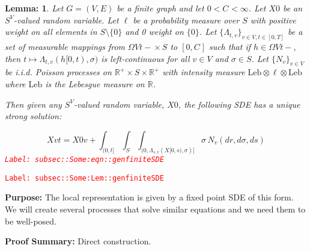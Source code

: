 \documentclass[12pt]{article}
\newcommand{\mb}{\mathbb}
\newcommand{\te}{\text}
\newcommand{\tr}{\textcolor{red}}
\newcommand{\labe}[1]{\tr{\texttt{Label: #1}}}
\newcommand{\purpose}{\textbf{Purpose: }}
\newcommand{\pfsum}{\textbf{Proof Summary: }}
\newcommand{\ind}{\hspace{24pt}}
\renewcommand{\v}{v}							%
\renewcommand{\S}{S}							%
\newcommand{\s}{\sigma}							%
\newcommand{\T}{T}								%
\renewcommand{\t}{t}							%
\renewcommand{\tt}{s}							%
\newcommand{\X}{X}								%
\newcommand{\poiss}[1]{N_{#1}}						%
\newcommand{\leb}{\te{Leb}}							%
\renewcommand{\r}{r}								%
\newcommand{\ratee}[1]{\Lambda_{#1}}				%
\newcommand{\const}[1]{C_{#1}}						%
\newcommand{\Sm}{\ell}								%
\newtheorem{lem}[thms]{Lemma: }
\begin{document}
\begin{lem}
Let \(G = ( V,E)\) be a finite graph and let \(0 < \const{}< \infty\). Let \(\X{}{0}\) be an \(\S^ V\)-valued random variable. Let \(\Sm\) be a probability measure over \(\S\) with positive weight on all elements in \(S\setminus\{0\}\) and 0 weight on \(\{0\}\). Let \(\{\ratee{\t,\v}\}_{\v \in  V,\t\in [0,\T]}\) be a set of measurable mappings from \(\Omega{ V}{\t-} \times \S\) to \([0,\const{}]\) such that if \(h \in \Omega{ V}{\t-}\), then \(\t\mapsto \ratee{\t,\v}(h[0,\t),\s)\) is left-continuous for all \(\v \in  V\) and \(\s \in \S\). Let \(\{\poiss{\v}\}_{\v \in  V}\) be i.i.d. Poisson processes on \(\mb{R}^+\times \S\times\mb{R}^+\) with intensity measure \(\leb\otimes\Sm\otimes\leb\) where \(\leb\) is the Lebesgue measure on \(\mb{R}\).

\ind Then given any \(\S^ V\)-valued random variable, \(\X{}{0}\), the following SDE has a unique strong solution:

\begin{equation}
\X{\v}{\t} = \X{0}{\v} + \int_{(0,\t]}\int_\S\int_{(0,\ratee{\tt,\v}(\X{}{[0,\tt)},\s)]}  \s\,\poiss{\v}(d\r,d\s,d\tt)
\label{subsec::Some:eqn::genfiniteSDE}
\end{equation}
\labe{subsec::Some:eqn::genfiniteSDE}
\label{subsec::Some:Lem::genfiniteSDE}
\end{lem}
\labe{subsec::Some:Lem::genfiniteSDE}

\purpose The local representation is given by a fixed point SDE of this form. We will create several processes that solve similar equations and we need them to be well-posed.

\pfsum Direct construction.
\end{document}
